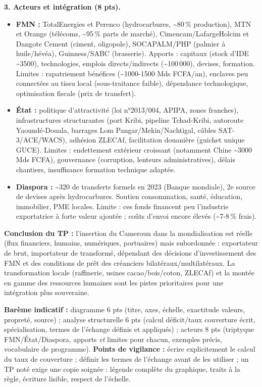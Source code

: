 \documentclass[11pt]{article}
\newcommand{\cle}[1]{{\popxbold\color{popdark}#1}}
\begin{document}
\begin{corrige}
\textbf{3. Acteurs et intégration (8 pts).}
\begin{itemize}
    \item \textbf{FMN :} TotalEnergies et Perenco (hydrocarbures, \textasciitilde 80\,\% production), MTN et Orange (télécoms, \textasciitilde 95\,\% parts de marché), Cimencam/LafargeHolcim et Dangote Cement (ciment, oligopole), SOCAPALM/PHP (palmier à huile/hévéa), Guinness/SABC (brasserie). Apports : capitaux (stock d'IDE \textasciitilde \SI{3500}{}), technologies, emplois directs/indirects (\textasciitilde 100\,000), devises, formation. Limites : rapatriement bénéfices (\textasciitilde 1000-1500 Mds FCFA/an), \cle{enclaves} peu connectées au tissu local (sous-traitance faible), dépendance technologique, optimisation fiscale (prix de transfert).
    \item \textbf{État :} politique d'attractivité (loi n°2013/004, APIPA, zones franches), infrastructures structurantes (port Kribi, pipeline Tchad-Kribi, autoroute Yaoundé-Douala, barrages Lom Pangar/Mekin/Nachtigal, câbles SAT-3/ACE/WACS), adhésion ZLECAf, facilitation douanière (guichet unique GUCE). Limites : endettement extérieur croissant (notamment Chine \textasciitilde 3000 Mds FCFA), gouvernance (corruption, lenteurs administratives), délais chantiers, insuffisance formation technique adaptée.
    \item \textbf{Diaspora :} \textasciitilde \SI{320}{} de transferts formels en 2023 (Banque mondiale), 2e source de devises après hydrocarbures. Soutien consommation, santé, éducation, immobilier, PME locales. Limite : ces fonds financent peu l'industrie exportatrice à forte valeur ajoutée ; coûts d'envoi encore élevés (\textasciitilde 7-8\,\% frais).
\end{itemize}
\textbf{Conclusion du TP :} l'insertion du Cameroun dans la mondialisation est réelle (flux financiers, humains, numériques, portuaires) mais \cle{subordonnée} : exportateur de brut, importateur de transformé, dépendant des décisions d'investissement des FMN et des conditions de prêt des créanciers bilatéraux/multilatéraux. La transformation locale (raffinerie, usines cacao/bois/coton, ZLECAf) et la montée en gamme des ressources humaines sont les pistes prioritaires pour une intégration plus souveraine.

\textbf{Barème indicatif :} diagramme 6 pts (titre, axes, échelle, exactitude valeurs, propreté, source) ; analyse structurelle 6 pts (calcul déficit/taux couverture écrit, spécialisation, termes de l'échange définis et appliqués) ; acteurs 8 pts (triptyque FMN/État/Diaspora, apports \emph{et} limites pour chacun, exemples précis, vocabulaire de programme).
\textbf{Points de vigilance :} écrire explicitement le calcul du taux de couverture ; définir les termes de l'échange avant de les utiliser ; un TP noté exige une copie soignée : légende complète du graphique, traits à la règle, écriture lisible, respect de l'échelle.
\end{corrige}
\end{document}
